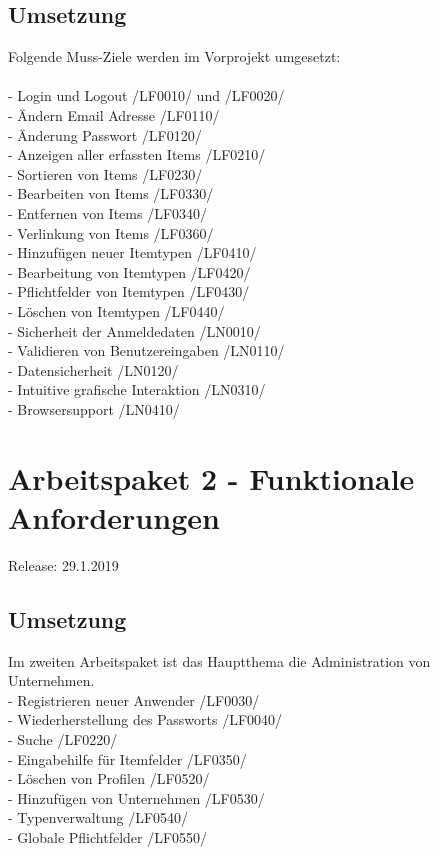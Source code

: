 \documentclass[11pt,a4paper]{report}
\begin{document}
\subsection{Umsetzung}
Folgende Muss-Ziele werden im Vorprojekt umgesetzt:\\
\\
- Login und Logout /LF0010/ und /LF0020/  \\
- Ändern Email Adresse /LF0110/ \\
- Änderung Passwort /LF0120/ \\
- Anzeigen aller erfassten Items /LF0210/ \\
- Sortieren von Items /LF0230/ \\
- Bearbeiten von Items /LF0330/ \\
- Entfernen von Items /LF0340/ \\
- Verlinkung von Items /LF0360/ \\
- Hinzufügen neuer Itemtypen /LF0410/ \\
- Bearbeitung von Itemtypen /LF0420/ \\
- Pflichtfelder von Itemtypen /LF0430/ \\
- Löschen von Itemtypen /LF0440/ \\
- Sicherheit der Anmeldedaten /LN0010/ \\
- Validieren von Benutzereingaben /LN0110/ \\
- Datensicherheit /LN0120/ \\
- Intuitive grafische Interaktion /LN0310/ \\
- Browsersupport /LN0410/ \\

\section{Arbeitspaket 2 - Funktionale Anforderungen }
Release: 29.1.2019 \\
\subsection{Umsetzung}
Im zweiten Arbeitspaket ist das Hauptthema die Administration von Unternehmen.\\
- Registrieren neuer Anwender /LF0030/ \\
- Wiederherstellung des Passworts /LF0040/ \\
- Suche /LF0220/ \\
- Eingabehilfe für Itemfelder /LF0350/ \\
- Löschen von Profilen /LF0520/ \\
- Hinzufügen von Unternehmen /LF0530/ \\
- Typenverwaltung /LF0540/ \\
- Globale Pflichtfelder /LF0550/ \\
\newpage
\end{document}
